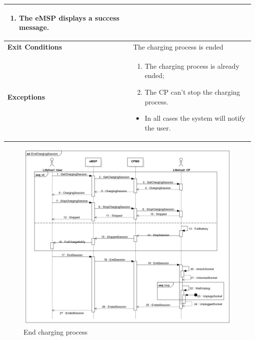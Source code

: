 \documentclass{Configuration_Files/PoliMi3i_thesis}
\begin{document}
\begin{table}[H]
\begin{xltabular}{\textwidth}{| >{}l | X |}
\begin{enumerate}
        \item The eMSP displays a success message.
        \end{enumerate}\B\\
    \hline
    \textbf{Exit Conditions} & The charging process is ended\B\\
    \hline
    \textbf{Exceptions} & 
    \begin{enumerate}
        \item The charging process is already ended;
        \item The CP can’t stop the charging process.
    \end{enumerate}
    \begin{itemize}
        \item In all cases the system will notify the user.
    \end{itemize}\B\\
    \hline
    \end{xltabular}
\end{table}

\begin{figure}[H]
    \centering
    \includegraphics[width=1\textwidth]{Images/UseCases/EndChargingSession.jpg}
    \caption{End charging process}
\end{figure}

\end{document}
